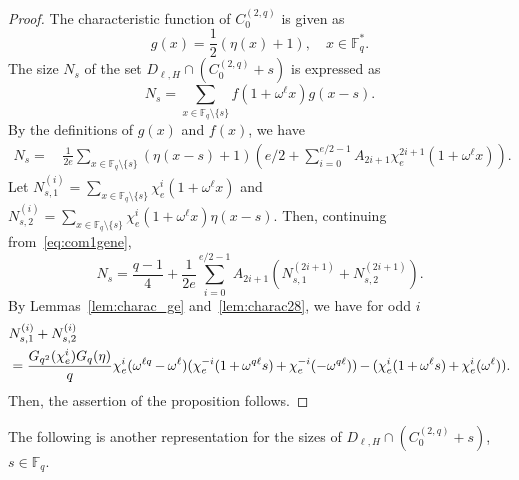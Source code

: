 \documentclass[ALCO,ThmDefs,Unicode]{cedram}
\newcommand*\F{{\mathbb F}}
\newcommand*{\mk}{\mkern -1mu}
\begin{document}
\begin{proof}
The characteristic function of $C_0^{(2,q)}$ is given as
\[
g(x)=\frac{1}{2}(\eta(x)+1), \quad x\in \F_q^\ast.
\]
The size $N_s$ of the set $D_{\ell,H}\cap (C_0^{(2,q)}+s)$ is expressed as
\[
N_s=\sum_{x\in \F_q\setminus \{s\}}f(1+\omega^\ell x)g(x-s).
\]
By the definitions of $g(x)$ and $f(x)$, we have
\begin{align}
N_s =&\,\frac{1}{2e}\sum_{x\in \F_q\setminus \{s\}}(\eta(x-s)+1)\left(e/2+\sum_{i=0}^{e/2-1}A_{2i+1}\chi_e^{2i+1}(1+\omega^\ell x)\right). \label{eq:com1gene}
\end{align}
Let $N_{s,1}^{(i)}=\sum_{x\in \F_q\setminus \{s\}}\chi_e^i(1+\omega^\ell x)$ and $N_{s,2}^{(i)}=\sum_{x\in \F_q\setminus \{s\}}\chi_e^i(1+\omega^\ell x)\eta(x-s)$. Then, continuing from~\eqref{eq:com1gene},
\[
N_s=
\frac{q-1}{4}+\frac{1}{2e}\sum_{i=0}^{e/2-1}A_{2i+1}(N_{s,1}^{(2i+1)}+N_{s,2}^{(2i+1)}).
\]
By Lemmas~\ref{lem:charac_ge} and~\ref{lem:charac28}, we have for odd $i$
\begin{align*}
&N_{s,1}^{(i)}+N_{s,2}^{(i)}\\
&=\frac{G_{q^2}(\chi_e^i)G_q(\eta)}{q}\chi_e^i(\omega^{\ell q}\mk-\mk\omega^\ell) (\chi_e^{-i}(1\mk+\mk\omega^{q\ell} s)\mk+\mk\chi_e^{-i}(-\omega^{q\ell})) \mk-\mk(\chi_e^i(1\mk+\mk\omega^\ell s)\mk+\mk\chi_e^i(\omega^\ell)).
\end{align*}
Then, the assertion of the proposition follows.
\end{proof}

The following is another representation for the sizes of $D_{\ell,H}\cap (C_0^{(2,q)}+s)$, $s\in \F_q$.
\end{document}
